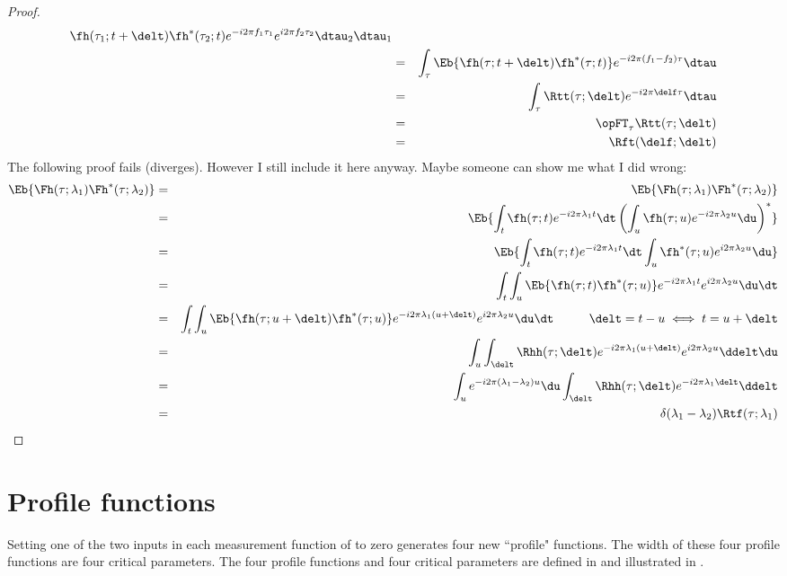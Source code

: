\begin{proof}
\begin{eqnarray*}
{             \fh(\tau_1;t+\delt) \fh^\ast(\tau_2;t) }
              e^{-i2\pi f_1\tau_1}e^{i2\pi f_2\tau_2} 
            \dtau_2 \dtau_1
   \\&=& \int_{\tau}\Eb{
             \fh(\tau;t+\delt) \fh^\ast(\tau;t) }
              e^{-i2\pi (f_1-f_2)\tau}
            \dtau
   \\&=& \int_{\tau}\Rtt(\tau;\delt)
              e^{-i2\pi \delf \tau}
            \dtau
   \\&=& \opFT_\tau \Rtt(\tau;\delt)
   \\&=& \Rft(\delf;\delt)
\end{eqnarray*}
The following proof fails (diverges).
However I still include it here anyway.
Maybe someone can show me what I did wrong:
\begin{eqnarray*}
  \Eb{ \Fh(\tau;\lambda_1) \Fh^\ast(\tau;\lambda_2) }
    &=& \Eb{ \Fh(\tau;\lambda_1) \Fh^\ast(\tau;\lambda_2) }
  \\&=& \Eb{   \int_t \fh(\tau;t) e^{-i2\pi\lambda_1 t} \dt
        \left( \int_u \fh(\tau;u) e^{-i2\pi\lambda_2 u} \du \right)^\ast
        }
  \\&=& \Eb{ \int_t \fh     (\tau;t) e^{-i2\pi\lambda_1 t} \dt
             \int_u \fh^\ast(\tau;u) e^{ i2\pi\lambda_2 u} \du 
        }
  \\&=& \int_t \int_u  \Eb{ \fh(\tau;t) \fh^\ast(\tau;u) }
             e^{-i2\pi\lambda_1t} e^{ i2\pi\lambda_2u} \du \dt 
  \\&=& \int_t \int_u  \Eb{ \fh(\tau;u+\delt) \fh^\ast(\tau;u) }
             e^{-i2\pi\lambda_1(u+\delt)} e^{ i2\pi\lambda_2u} \du \dt 
        \hspace{1cm}\delt=t-u \iff t=u+\delt
  \\&=& \int_u \int_{\delt}  \Rhh(\tau;\delt)
             e^{-i2\pi\lambda_1(u+\delt)} e^{ i2\pi\lambda_2u} \ddelt \du 
  \\&=& \int_u e^{-i2\pi(\lambda_1-\lambda_2)u} \du 
        \int_{\delt}  \Rhh(\tau;\delt) e^{-i2\pi\lambda_1\delt}  \ddelt 
  \\&=& \delta(\lambda_1-\lambda_2)\Rtf(\tau;\lambda_1)
\end{eqnarray*}
\end{proof}
\section{Profile functions}
Setting one of the two inputs in each 
measurement function of  to zero
generates four new ``profile" functions.
The width of these four profile functions are four critical parameters.
The four profile functions and four critical parameters are
defined in  and 
illustrated in .



